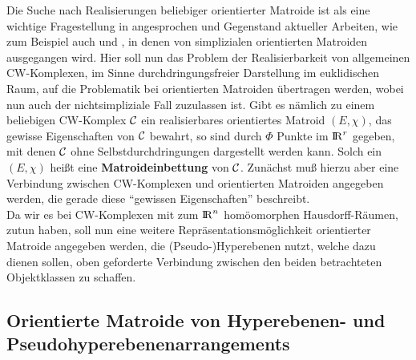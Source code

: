 Die Suche nach Realisierungen beliebiger orientierter Matroide ist als eine
wichtige Fragestellung in \cite{Bj:93} angesprochen und Gegenstand aktueller
Arbeiten, wie zum Beispiel auch \cite{Schu:92} und \cite{Dau:89}, in denen von
simplizialen orientierten Matroiden ausgegangen wird. Hier soll nun das Problem
der Realisierbarkeit von allgemeinen CW-Komplexen, im Sinne durchdringungsfreier
Darstellung im euklidischen Raum, auf die Problematik bei orientierten Matroiden
übertragen werden, wobei nun auch der nichtsimpliziale Fall zuzulassen ist.
Gibt es nämlich zu einem beliebigen CW-Komplex $\cal C$ ein realisierbares
orientiertes Matroid $(E,\chi)$, das gewisse Eigenschaften von $\cal C$
bewahrt, so sind durch $\Phi$ Punkte im $\mbox{$\rm I\!R$}^r$ gegeben, mit denen $\cal C$ ohne
Selbstdurchdringungen dargestellt werden kann. Solch ein $(E,\chi)$ heißt eine
{\bf Matroideinbettung} von $\cal C$. Zunächst muß
hierzu aber eine Verbindung zwischen CW-Komplexen und orientierten Matroiden
angegeben werden, die gerade diese "`gewissen Eigenschaften"' beschreibt.\\
Da wir es bei CW-Komplexen mit zum $\mbox{$\rm I\!R$}^n$ homöomorphen Hausdorff-Räumen,
zutun haben, soll nun eine weitere Repräsentationsmöglichkeit orientierter
Matroide angegeben werden, die (Pseudo-)Hyperebenen nutzt, welche dazu dienen
sollen, oben geforderte Verbindung zwischen den beiden betrachteten
Objektklassen zu schaffen.

\subsection{Orientierte Matroide von Hy\-per\-ebe\-nen- und
            Pseu\-do\-hy\-per\-ebe\-nen\-arrange\-ments}

